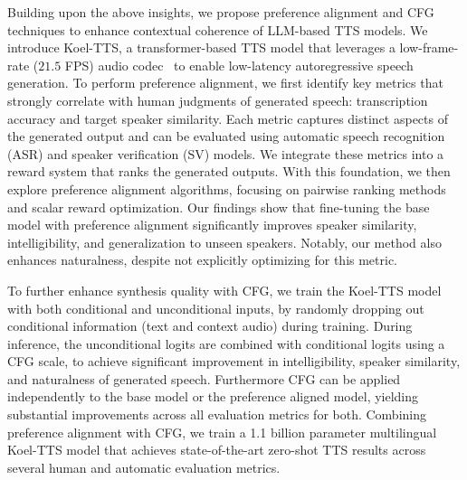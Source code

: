 Building upon the above insights, 
we propose preference alignment and CFG techniques to enhance contextual coherence of LLM-based TTS models.
We introduce Koel-TTS, a transformer-based TTS model that leverages a low-frame-rate ($21.5$ FPS) audio codec~\cite{casanova2024low} to enable low-latency autoregressive speech generation. 
To perform preference alignment, we first identify key metrics that strongly correlate with human judgments of generated speech: transcription accuracy and target speaker similarity. Each metric captures distinct aspects of the generated output and can be evaluated using automatic speech recognition (ASR) and speaker verification (SV) models. We integrate these metrics into a reward system that ranks the generated outputs. 
With this foundation, we then explore preference alignment algorithms, focusing on pairwise ranking methods and scalar reward optimization. 
Our findings show that fine-tuning the base model with preference alignment significantly improves speaker similarity, intelligibility, and generalization to unseen speakers. Notably, our method also enhances naturalness, despite not explicitly optimizing for this metric.

To further enhance synthesis quality with CFG, we train the Koel-TTS model with both conditional and unconditional inputs, by randomly dropping out conditional information (text and context audio) during training.
During inference, the unconditional logits are combined with conditional logits using a CFG scale, to achieve significant improvement in intelligibility, speaker similarity, and naturalness of generated speech. Furthermore CFG can be applied independently to the base model or the preference aligned model, yielding substantial improvements across all
evaluation metrics for both. Combining preference alignment with CFG, we train a 1.1 billion parameter multilingual Koel-TTS model that
achieves state-of-the-art zero-shot TTS results across several human and automatic evaluation metrics.


